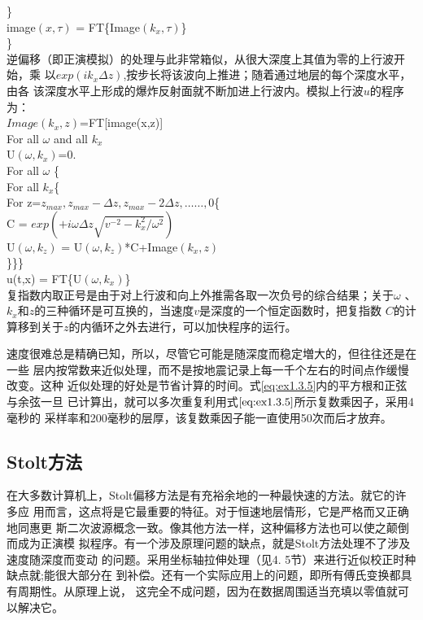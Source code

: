 	\}\\
	image$(x,\tau)$ = FT\{Image$(k_x,\tau)$\}\\
\}\\
逆偏移（即正演模拟）的处理与此非常箱似，从很大深度上其值为零的上行波开始，乘
以$exp(ik_x\Delta z)$,按步长将该波向上推进；随着通过地层的每个深度水平，由各
该深度水平上形成的爆炸反射面就不断加进上行波内。模拟上行波$u$的程序为：\\
$Image(k_x,z)$=FT[image(x,z)]\\
For all $\omega$ and all $k_x$\\
	U$(\omega,k_x)$=0.\\
For all $\omega$ \{\\
For all $k_x$\{\\
For z=$z_{max}, z_{max}-\Delta z, z_{max}-2\Delta z, \ldots\ldots, 0$\{\\
	C = $exp(+i\omega\Delta z\sqrt{v^{-2}-k_x^2/\omega^2})$\\
	U$(\omega,k_z)$ = U$(\omega,k_z)$*C+Image$(k_x,z)$\\
	\}\}\}\\
u(t,x) = FT\{U$(\omega,k_x)$\} \\
复指数内取正号是由于对上行波和向上外推需各取一次负号的综合结果；关于$\omega$
、$k_x$和$z$的三种循环是可互换的，当速度$v$是深度的一个恒定函数时，把复指数
$C$的计算移到关于$z$的内循环之外去进行，可以加快程序的运行。

速度很难总是精确已知，所以，尽管它可能是随深度而稳定増大的，但往往还是在一些
层内按常数来近似处理，而不是按地震记录上每一千个左右的时间点作缓慢改变。这种
近似处理的好处是节省计算的时间。式\ref{eq:ex1.3.5}内的平方根和正弦与余弦一旦
已计算出，就可以多次重复利用式$\ref{eq:ex1.3.5}$所示复数乘因子，采用4毫秒的
采样率和200毫秒的层厚，该复数乘因子能一直使用50次而后才放弃。

\subsection{Stolt方法}
\label{sec:1.3.6}

在大多数计算机上，Stolt偏移方法是有充裕余地的一种最快速的方法。就它的许多应
用而言，这点将是它最重要的特征。对于恒速地层情形，它是严格而又正确地同惠更
斯二次波源概念一致。像其他方法一样，这种偏移方法也可以使之颠倒而成为正演模
拟程序。有一个涉及原理问题的缺点，就是Stolt方法处理不了涉及速度随深度而变动
的问题。采用坐标轴拉伸处理（见4. 5节）来进行近似校正时种缺点就;能很大部分在
到补偿。还有一个实际应用上的问题，即所有傅氏变换都具有周期性。从原理上说，
这完全不成问题，因为在数据周围适当充填以零值就可以解决它。

